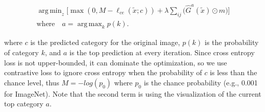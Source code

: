 \documentclass[10pt,twocolumn,letterpaper]{article}
\DeclareMathOperator*{\argmax}{arg\,max}
\DeclareMathOperator*{\argmin}{arg\,min}
\begin{document}

\begin{equation}
\begin{split}
     \argmin_{z}\Big[\max(0, M -\ell_{ce}(\tilde x; c)) + \lambda \sum_{ij} \big(\hat{G}^a(\tilde x) \odot m\big)\Big ] \\ \text{where} \quad a=\argmax_k{p(k)}. \nonumber
\end{split}
\end{equation}


\noindent where $c$ is the predicted category for the original image, $p(k)$ is the probability of category $k$, and $a$ is the top prediction at every iteration. Since cross entropy loss is not upper-bounded, it can dominate the optimization, so we use contrastive loss \cite{hadsell2006dimensionality} to ignore cross entropy  when the probability of $c$ is less than the chance level, thus $M=-log(p_0)$ where $p_0$ is the chance probability (e.g., 0.001 for ImageNet). Note that the second term is using the visualization of the current top category $a$.
\end{document}

